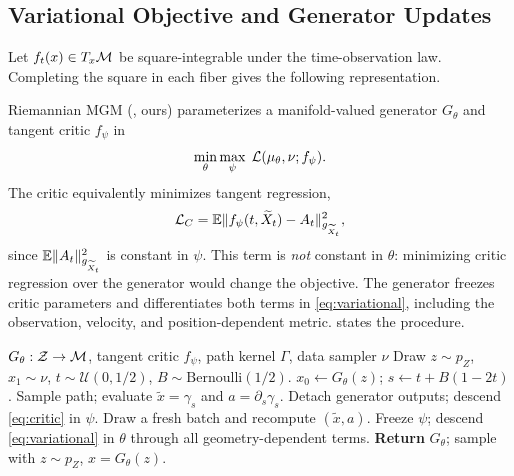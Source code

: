 \subsection{Variational Objective and Generator Updates}
Let $f_t(x)\in T_x\M$ be square-integrable under the time-observation law. Completing the square in each fiber gives the following representation.

Riemannian MGM (\RMGM, ours) parameterizes a manifold-valued generator $G_\theta$ and tangent critic $f_\psi$ in
\begin{equation}
\min_\theta\max_\psi\;\Lcal(\mu_\theta,\nu;f_\psi).
\label{eq:saddle}
\end{equation}
The critic equivalently minimizes tangent regression,
\begin{equation}
\Lcal_C=\E\norm{g_{\widetilde X_t}}{f_\psi(t,\widetilde X_t)-A_t}^2,
\label{eq:critic}
\end{equation}
since $\E\norm{g_{\widetilde X_t}}{A_t}^2$ is constant in $\psi$. This term is \emph{not} constant in $\theta$: minimizing critic regression over the generator would change the objective. The generator freezes critic parameters and differentiates both terms in \cref{eq:variational}, including the observation, velocity, and position-dependent metric.  states the procedure.

\begin{algorithm}[t]
\caption{Riemannian Midpoint Generative Models (ours)}
\label{alg:rmgm}
\begin{algorithmic}[1]
\REQUIRE $G_\theta:\mathcal Z\to\M$, tangent critic $f_\psi$, path kernel $\Gamma$, data sampler $\nu$
\STATE Draw $z\sim p_Z$, $x_1\sim\nu$, $t\sim\mathcal U(0,1/2)$, $B\sim\mathrm{Bernoulli}(1/2)$.
\STATE $x_0\gets G_\theta(z)$; $s\gets t+B(1-2t)$.
\STATE Sample path; evaluate $\widetilde x=\gamma_s$ and $a=\partial_s\gamma_s$.
\STATE Detach generator outputs; descend \cref{eq:critic} in $\psi$.
\STATE Draw a fresh batch and recompute $(\widetilde x,a)$.
\STATE Freeze $\psi$; descend \cref{eq:variational} in $\theta$ through all geometry-dependent terms.
\ENDFOR
\STATE \textbf{Return} $G_\theta$; sample with $z\sim p_Z$, $x=G_\theta(z)$.
\end{algorithmic}
\end{algorithm}

